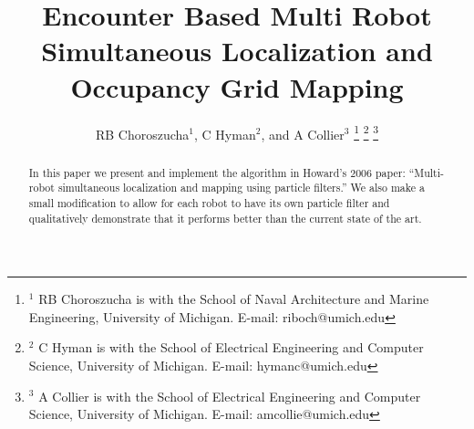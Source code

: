 \documentclass[letterpaper, 10 pt, conference]{ieeeconf}  %
\title{Encounter Based Multi Robot Simultaneous Localization and Occupancy Grid Mapping}
\author{RB Choroszucha$^{1}$, C Hyman$^{2}$, and A Collier$^{3}$ %
\thanks{$^{1}$ RB Choroszucha is with the School of Naval Architecture and Marine Engineering, University of Michigan.  E-mail: riboch{@}umich.edu}%
\thanks{$^{2}$ C Hyman is with the School of Electrical Engineering and Computer Science, University of Michigan. E-mail: {hymanc}{@}umich.edu}
\thanks{$^{3}$ A Collier is with the School of Electrical Engineering and Computer Science, University of Michigan. E-mail: {amcollie}{@}umich.edu}
}
\begin{document}
\maketitle
\thispagestyle{empty}
\pagestyle{empty}


\begin{abstract}

In this paper we present and implement the algorithm in Howard's 2006 paper: ``Multi-robot simultaneous localization and mapping using particle filters.''  We also make a small modification to allow for each robot to have its own particle filter and qualitatively demonstrate that it performs better than the current state of the art.


\end{abstract}
















\addtolength{\textheight}{-12cm}   %







\end{document}
